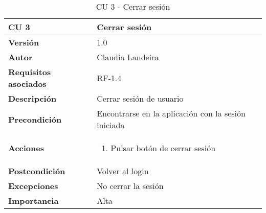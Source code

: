 \begin{table}[p]
	\centering
	\begin{tabularx}{\linewidth}{ p{} p{} }
		\toprule
		\textbf{CU 3}    & \textbf{Cerrar sesión}\\
		\toprule
		\textbf{Versión}              & 1.0    \\
		\textbf{Autor}                & Claudia Landeira \\
		\textbf{Requisitos asociados} & RF-1.4\\
		\textbf{Descripción}          & Cerrar sesión de usuario\\
		\textbf{Precondición}         & Encontrarse en la aplicación con la sesión iniciada\\
		\textbf{Acciones}             &
		\begin{enumerate}
			\def\labelenumi{\arabic{enumi}.}
			\tightlist
                \item Pulsar botón de cerrar sesión
		\end{enumerate}\\
		\textbf{Postcondición}        & Volver al login \\
		\textbf{Excepciones}          & No cerrar la sesión \\
		\textbf{Importancia}          & Alta \\
		\bottomrule
	\end{tabularx}
	\caption{CU 3 - Cerrar sesión}
\end{table}

